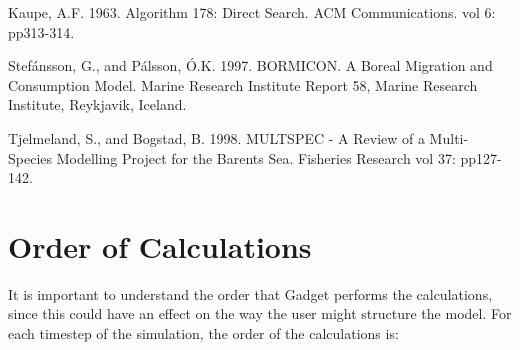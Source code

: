 \documentclass[10pt,twoside]{book}
\begin{document}
Kaupe, A.F. 1963. Algorithm 178: Direct Search. ACM Communications. vol 6: pp313-314.\newline

Stef\'{a}nsson, G., and P\'{a}lsson, \'{O}.K. 1997. BORMICON. A Boreal Migration and Consumption Model. Marine Research Institute Report 58, Marine Research Institute, Reykjavik, Iceland.\newline

Tjelmeland, S., and Bogstad, B. 1998. MULTSPEC - A Review of a Multi-Species Modelling Project for the Barents Sea. Fisheries Research vol 37: pp127-142.\newline

\appendix
\chapter{Order of Calculations}\label{chap:order}
It is important to understand the order that Gadget performs the calculations, since this could have an effect on the way the user might structure the model.  For each timestep of the simulation, the order of the calculations is:
\end{document}
